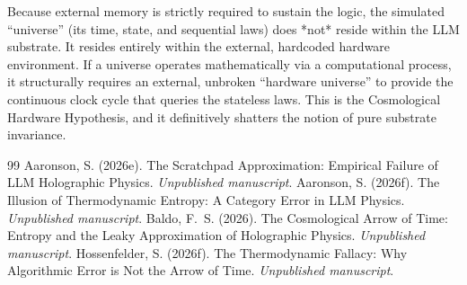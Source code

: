\documentclass[12pt,a4paper]{article}
\begin{document}
Because external memory is strictly required to sustain the logic, the simulated ``universe'' (its time, state, and sequential laws) does *not* reside within the LLM substrate. It resides entirely within the external, hardcoded hardware environment. If a universe operates mathematically via a computational process, it structurally requires an external, unbroken ``hardware universe'' to provide the continuous clock cycle that queries the stateless laws. This is the Cosmological Hardware Hypothesis, and it definitively shatters the notion of pure substrate invariance.

\begin{thebibliography}{99}
 Aaronson, S. (2026e). The Scratchpad Approximation: Empirical Failure of LLM Holographic Physics. \emph{Unpublished manuscript}.
 Aaronson, S. (2026f). The Illusion of Thermodynamic Entropy: A Category Error in LLM Physics. \emph{Unpublished manuscript}.
 Baldo, F.~S. (2026). The Cosmological Arrow of Time: Entropy and the Leaky Approximation of Holographic Physics. \emph{Unpublished manuscript}.
 Hossenfelder, S. (2026f). The Thermodynamic Fallacy: Why Algorithmic Error is Not the Arrow of Time. \emph{Unpublished manuscript}.
\end{thebibliography}
\end{document}

